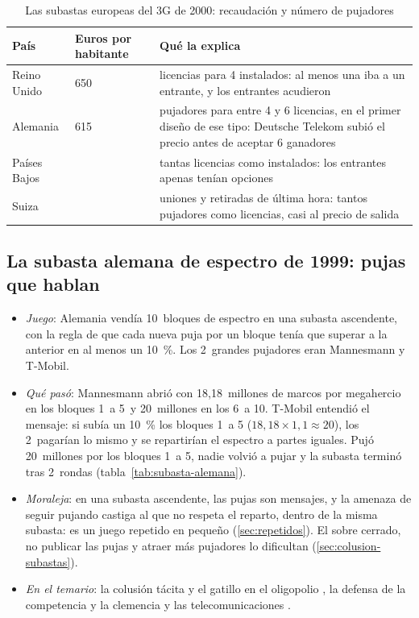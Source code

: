 \documentclass[11pt]{article}
\begin{document}
\begin{table}[H]
\centering
\caption{Las subastas europeas del 3G de 2000: recaudación y número de pujadores}\label{tab:subastas-3g}
\begin{tabular}{>{\raggedright\arraybackslash}m{2.6cm}>{\centering\arraybackslash}m{2.4cm}>{\raggedright\arraybackslash}m{8.0cm}}
\toprule
\rowcolor{tceeazulpalido}\textbf{País} & \textbf{Euros por habitante} & \textbf{Qué la explica}\\
\midrule
Reino Unido & \cellcolor{tceesalvia}650 & 5 licencias para 4 instalados: al menos una iba a un entrante, y los entrantes acudieron\\
\addlinespace[0.3em]
Alemania & \cellcolor{tceesalvia}615 & 7 pujadores para entre 4 y 6 licencias, en el primer diseño de ese tipo: Deutsche Telekom subió el precio antes de aceptar 6 ganadores\\
\addlinespace[0.3em]
Países Bajos & 170 & tantas licencias como instalados: los entrantes apenas tenían opciones\\
\addlinespace[0.3em]
Suiza & 20 & uniones y retiradas de última hora: tantos pujadores como licencias, casi al precio de salida\\
\bottomrule
\end{tabular}
\end{table}

\subsection*{La subasta alemana de espectro de 1999: pujas que hablan}

\begin{itemize}
\item \emph{Juego}\nocite{Klemperer2002WhatReallyMatters}: Alemania vendía 10~bloques de espectro en una subasta ascendente, con la regla de que cada nueva puja por un bloque tenía que superar a la anterior en al menos un 10~\%. Los 2~grandes pujadores eran Mannesmann y T-Mobil.
\item \emph{Qué pasó}: Mannesmann abrió con 18,18~millones de marcos por megahercio en los bloques 1~a 5~y 20~millones en los 6~a 10. T-Mobil entendió el mensaje: si subía un 10~\% los bloques 1~a 5 ($18{,}18\times1{,}1\approx20$), los 2~pagarían lo mismo y se repartirían el espectro a partes iguales. Pujó 20~millones por los bloques 1~a 5, nadie volvió a pujar y la subasta terminó tras 2~rondas\nocite{Klemperer2002WhatReallyMatters} (tabla~\ref{tab:subasta-alemana}).
\item \emph{Moraleja}: en una subasta ascendente, las pujas son mensajes, y la amenaza de seguir pujando castiga al que no respeta el reparto, dentro de la misma subasta: es un juego repetido en pequeño (\ref{sec:repetidos}). El sobre cerrado, no publicar las pujas y atraer más pujadores lo dificultan (\ref{sec:colusion-subastas}).
\item \emph{En el temario}: la colusión tácita y el gatillo en el oligopolio , la defensa de la competencia y la clemencia  y las telecomunicaciones .
\end{itemize}
\end{document}
